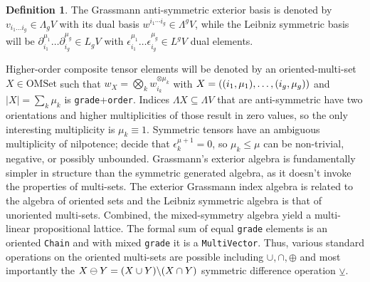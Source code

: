\documentclass[]{article}
\theoremstyle{definition}
\newtheorem{definition}{Definition}
\theoremstyle{remark}
\begin{document}
\begin{definition}
	The Grassmann anti-symmetric exterior basis is denoted by $v_{i_1\dots i_g}\in\Lambda_gV$ with its dual basis $w^{i_1\cdots i_g}\in\Lambda^gV$, while the Leibniz symmetric basis will be $\partial_{i_1}^{\mu_1}\dots\partial_{i_g}^{\mu_g}\in L_gV$ with $\epsilon_{i_1}^{\mu_1}\dots\epsilon_{i_g}^{\mu_g}\in L^gV$ dual elements.
\end{definition}
Higher-order composite tensor elements will be denoted by an oriented-multi-set $X\in\text{OMSet}$ such that $w_X = \bigotimes_k w_{i_k}^{\otimes\mu_k}$ with $X = \left((i_1,\mu_1),\dots,(i_g,\mu_g)\right)$ and $|X|=\sum_k\mu_k$ is \verb`grade`+\verb`order`.
Indices $\Lambda X\subseteq\Lambda V$ that are anti-symmetric have two orientations and higher multiplicities of those result in zero values, so the only interesting multiplicity is $\mu_k\equiv 1$.
Symmetric tensors have an ambiguous multiplicity of nilpotence; decide that $\epsilon_k^{\mu+1}=0$, so $\mu_k\leq\mu$ can be non-trivial, negative, or possibly unbounded.
Grassmann's exterior algebra is fundamentally simpler in structure than the symmetric generated algebra, as it doesn't invoke the properties of multi-sets.
The exterior Grassmann index algebra is related to the algebra of oriented sets and the Leibniz symmetric algebra is that of unoriented multi-sets. 
Combined, the mixed-symmetry algebra yield a multi-linear propositional lattice.
The formal sum of equal \verb`grade` elements is an oriented \verb`Chain` and with mixed \verb`grade` it is a \verb`MultiVector`.
Thus, various standard operations on the oriented multi-sets are possible including $\cup,\cap,\oplus$ and most importantly the $X\ominus Y=(X\cup Y)\backslash(X\cap Y)$ symmetric difference operation $\veebar$.
\end{document}
